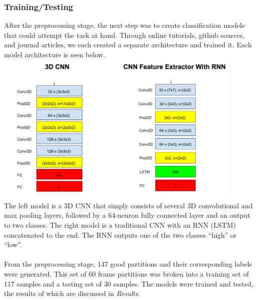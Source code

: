 \documentclass{article}
\begin{document}
{\subsubsection*{Training/Testing}{After the preprocessing stage, the next step was to create classification models that could attempt the task at hand. Through online tutorials, github sources, and journal articles, we each created a separate architecture and trained it. Each model architecture is seen below. \\

\includegraphics[width=0.9\textwidth]{../figs/models.png} \\
%
\noindent The left model is a 3D CNN that simply consists of several 3D convolutional and max pooling layers, followed by a 64-neuron fully connected layer and an output to two classes. The right model is a traditional CNN with an RNN (LSTM) concatenated to the end. The RNN outputs one of the two classes ``high'' or ``low''.  \\ \\
\noindent From the preprocessing stage, 147 good partitions and their corresponding labels were generated. This set of 60 frame partitions was broken into a training set of 117 samples and a testing set of 30 samples. The models were trained and tested, the results of which are discussed in \textit{Results}.}
\newpage
}
\end{document}
